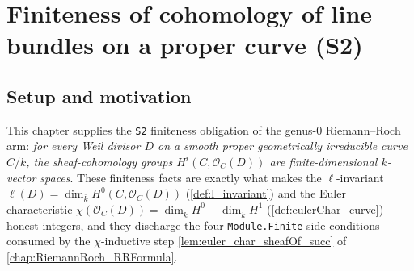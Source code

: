 \chapter{Finiteness of cohomology of line bundles on a proper curve (S2)}
\label{chap:Cohomology_SerreFiniteness}

\providecommand{\cechHI}{\mathtt{cechH1}}
\providecommand{\FiniteDimensional}{\mathrm{FiniteDimensional}}


\section{Setup and motivation}

This chapter supplies the \texttt{S2} finiteness obligation of the
genus-\(0\) Riemann--Roch arm: \emph{for every Weil divisor \(D\) on a
smooth proper geometrically irreducible curve \(C / \bar k\), the
sheaf-cohomology groups \(H^i(C, \mathcal O_C(D))\) are
finite-dimensional \(\bar k\)-vector spaces}. These finiteness facts are
exactly what makes the \(\ell\)-invariant \(\ell(D) = \dim_{\bar k}
H^0(C, \mathcal O_C(D))\) (\cref{def:l_invariant}) and the Euler
characteristic \(\chi(\mathcal O_C(D)) = \dim_{\bar k} H^0 -
\dim_{\bar k} H^1\) (\cref{def:eulerChar_curve}) honest integers, and
they discharge the four \texttt{Module.Finite} side-conditions consumed
by the \(\chi\)-inductive step
\cref{lem:euler_char_sheafOf_succ} of \cref{chap:RiemannRoch_RRFormula}.

